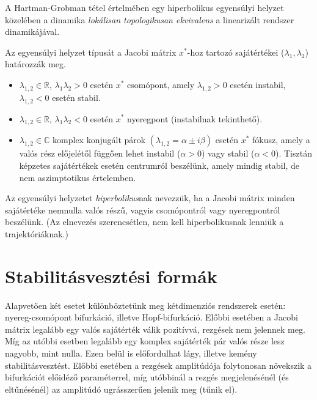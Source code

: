 A Hartman-Grobman tétel értelmében egy hiperbolikus egyensúlyi helyzet közelében a dinamika \emph{lokálisan topologikusan ekvivalens} a linearizált rendszer dinamikájával.

Az egyensúlyi helyzet típusát a Jacobi mátrix $x^*$-hoz tartozó  sajátértékei ($\lambda_1,\lambda_2$) határozzák meg.
\begin{itemize}
	\item $\lambda_{1,2}\in \mathbb{R}$, $\lambda_1\lambda_2>0$ esetén $x^*$ csomópont, amely $\lambda_{1,2}>0$ esetén instabil, $\lambda_{1,2}<0$ esetén stabil.
	\item $\lambda_{1,2}\in \mathbb{R}$, $\lambda_1\lambda_2<0$ esetén $x^*$ nyeregpont (instabilnak tekinthető).
	\item $\lambda_{1,2}\in \mathbb{C}$ komplex konjugált párok $(\lambda_{1,2}=\alpha\pm i\beta)$ esetén $x^*$ fókusz, amely a valós rész előjelétől függően lehet instabil ($\alpha>0$) vagy stabil ($\alpha<0$). Tisztán képzetes sajátértékek esetén centrumról beszélünk, amely mindig stabil, de nem aszimptotikus értelemben.
\end{itemize}
Az egyensúlyi helyzetet \emph{hiperbolikus}nak nevezzük, ha a Jacobi mátrix minden sajátértéke nemnulla valós részű, vagyis csomópontról vagy nyeregpontról beszélünk. (Az elnevezés szerencsétlen, nem kell hiperbolikusnak lenniük a trajektóriáknak.)


\section{Stabilitásvesztési formák}

Alapvetően két esetet különböztetünk meg kétdimenziós rendszerek esetén: nyereg-csomópont bifurkáció, illetve Hopf-bifurkáció. Előbbi esetében a Jacobi mátrix legalább egy valós sajátérték válik pozitívvá, rezgések nem jelennek meg. Míg az utóbbi esetben legalább egy komplex sajátérték pár valós része lesz nagyobb, mint nulla. Ezen belül is előfordulhat lágy, illetve kemény stabilitásvesztést. Előbbi esetében a rezgések amplitúdója folytonosan növekszik a bifurkációt előidéző paraméterrel, míg utóbbinál a rezgés megjelenésénél (és eltűnésénél) az amplitúdó ugrásszerűen jelenik meg (tűnik el).

